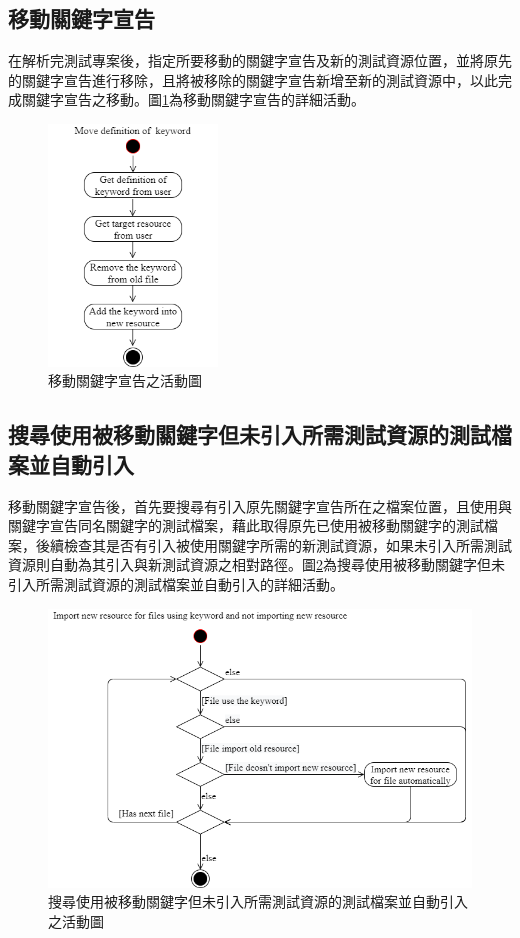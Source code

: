 \subsection{移動關鍵字宣告}\label{s3.3.2}
\indent
在解析完測試專案後，指定所要移動的關鍵字宣告及新的測試資源位置，並將原先的關鍵字宣告進行移除，且將被移除的關鍵字宣告新增至新的測試資源中，以此完成關鍵字宣告之移動。圖\ref{f3.7}為移動關鍵字宣告的詳細活動。

\begin{figure}[H]
    \centering
    \includegraphics[width=0.4\textwidth]{picture/Move_definition_of_keyword_2.png}
    \caption{移動關鍵字宣告之活動圖}
    \label{f3.7}
\end{figure}

\subsection{搜尋使用被移動關鍵字但未引入所需測試資源的測試檔案並自動引入}\label{s3.3.3}
\indent
移動關鍵字宣告後，首先要搜尋有引入原先關鍵字宣告所在之檔案位置，且使用與關鍵字宣告同名關鍵字的測試檔案，藉此取得原先已使用被移動關鍵字的測試檔案，後續檢查其是否有引入被使用關鍵字所需的新測試資源，如果未引入所需測試資源則自動為其引入與新測試資源之相對路徑。圖\ref{f3.8}為搜尋使用被移動關鍵字但未引入所需測試資源的測試檔案並自動引入的詳細活動。

\begin{figure}[H]
    \centering
    \includegraphics[width=1.0\textwidth]{picture/Import_resource_for_files_using_keyword_and_not_import_old_resource.png}
    \caption{搜尋使用被移動關鍵字但未引入所需測試資源的測試檔案並自動引入之活動圖}
    \label{f3.8}
\end{figure}

